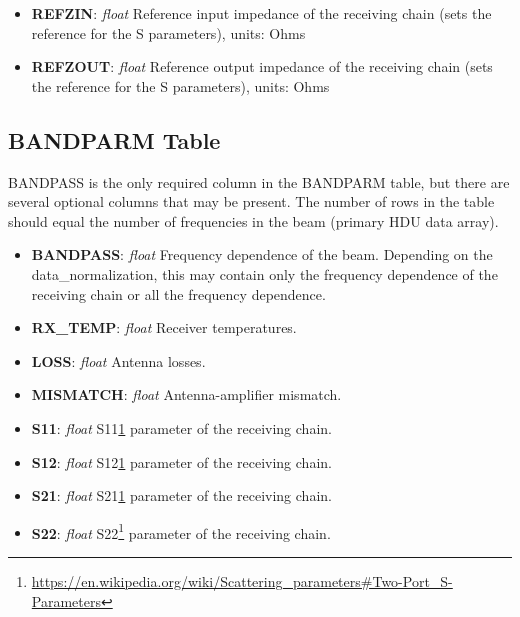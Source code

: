 \documentclass[11pt, oneside]{article}   	%
\begin{document}
\begin{itemize}
\item{\textbf{REFZIN}: \textit{float} Reference input impedance of the receiving chain (sets the reference for the S parameters), units: Ohms}
\item{\textbf{REFZOUT}: \textit{float} Reference output impedance of the receiving chain (sets the reference for the S parameters), units: Ohms}
\end{itemize}

\subsection{BANDPARM Table}
BANDPASS is the only required column in the BANDPARM table, but there are several optional columns that may be present. The number of rows in the table should equal the number of frequencies in the beam (primary HDU data array).

\begin{itemize}
\item{\textbf{BANDPASS}: \textit{float} Frequency dependence of the beam. Depending on the data\_normalization, this may contain only the frequency dependence of the receiving chain or all the frequency dependence.}
\item{\textbf{RX\_TEMP}: \textit{float} Receiver temperatures.}
\item{\textbf{LOSS}: \textit{float} Antenna losses.}
\item{\textbf{MISMATCH}: \textit{float} Antenna-amplifier mismatch.}
\item{\textbf{S11}: \textit{float} S11\cref{first} parameter of the receiving chain.}
\item{\textbf{S12}: \textit{float} S12\cref{first} parameter of the receiving chain.}
\item{\textbf{S21}: \textit{float} S21\cref{first} parameter of the receiving chain.}
\item{\textbf{S22}: \textit{float} S22\footnote{\label{first}\url{https://en.wikipedia.org/wiki/Scattering\_parameters\#Two-Port\_S-Parameters}} parameter of the receiving chain.}
\end{itemize}
\end{document}
